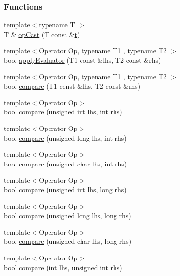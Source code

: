 \subsubsection*{Functions}
\begin{DoxyCompactItemize}
\item 
{\footnotesize template$<$typename T $>$ }\\T \& \hyperlink{a00120_adde98c1a650e94615e2b37ab0b3734e2}{op\+Cast} (T const \&\hyperlink{a00107_aaccc9105df5383111407fd5b41255e23}{t})
\item 
{\footnotesize template$<$Operator Op, typename T1 , typename T2 $>$ }\\bool \hyperlink{a00120_a3849d993997f2b708281ff02e77dfecf}{apply\+Evaluator} (T1 const \&lhs, T2 const \&rhs)
\item 
{\footnotesize template$<$Operator Op, typename T1 , typename T2 $>$ }\\bool \hyperlink{a00120_a64ae04769c4583b9d4027c792b496c7d}{compare} (T1 const \&lhs, T2 const \&rhs)
\item 
{\footnotesize template$<$Operator Op$>$ }\\bool \hyperlink{a00120_a171aec1826898b877980a2b15fe5f735}{compare} (unsigned int lhs, int rhs)
\item 
{\footnotesize template$<$Operator Op$>$ }\\bool \hyperlink{a00120_aa2698c33ec87b16aff5c844165483a7a}{compare} (unsigned long lhs, int rhs)
\item 
{\footnotesize template$<$Operator Op$>$ }\\bool \hyperlink{a00120_ad68724393ee3d7629001a2997f6134cc}{compare} (unsigned char lhs, int rhs)
\item 
{\footnotesize template$<$Operator Op$>$ }\\bool \hyperlink{a00120_ac2af7b6757f9bb3539bb78acff5c4649}{compare} (unsigned int lhs, long rhs)
\item 
{\footnotesize template$<$Operator Op$>$ }\\bool \hyperlink{a00120_ace20062a489a8a7049fe224d62e644a7}{compare} (unsigned long lhs, long rhs)
\item 
{\footnotesize template$<$Operator Op$>$ }\\bool \hyperlink{a00120_a640e0cce9260a912842bee58db501dc5}{compare} (unsigned char lhs, long rhs)
\item 
{\footnotesize template$<$Operator Op$>$ }\\bool \hyperlink{a00120_a17c92ed4b6d88a9f8bbcbc52544fe40f}{compare} (int lhs, unsigned int rhs)

\end{DoxyCompactItemize}
